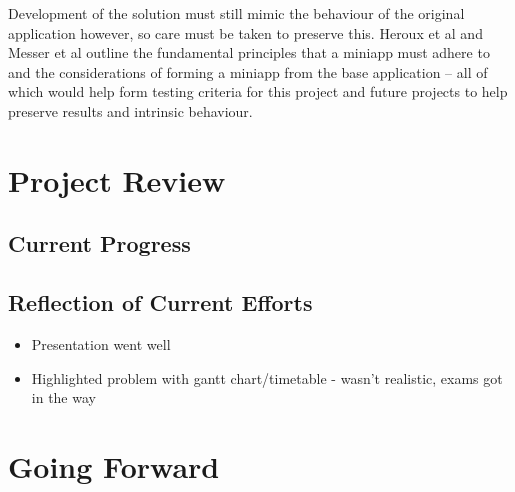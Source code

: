 \documentclass[conference]{IEEEtran}
\begin{document}
Development of the solution must still mimic the behaviour of the original application however, so care must be taken to preserve this. Heroux et al\cite{miniapps} and Messer et al\cite{messer2015developing} outline the fundamental principles that a miniapp must adhere to and the considerations of forming a miniapp from the base application – all of which would help form testing criteria for this project and future projects to help preserve results and intrinsic behaviour.


\section{Project Review}


\subsection{Current Progress}

\subsection{Reflection of Current Efforts}
\begin{itemize}
\item Presentation went well
\item Highlighted problem with gantt chart/timetable - wasn't realistic, exams got in the way
\end{itemize}


\section{Going Forward}





\end{document}
